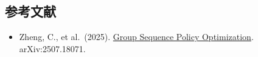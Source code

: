 \FloatBarrier
{}
\hypertarget{ux53c2ux8003ux6587ux732e-111}{%
\subsection{参考文献}\label{ux53c2ux8003ux6587ux732e-111}}

\vspace{0.25em}
\begin{itemize}
\tightlist
\item
  Zheng, C., et al.~(2025). \href{https://arxiv.org/abs/2507.18071}{Group Sequence Policy Optimization}. arXiv:2507.18071.
\end{itemize}

\clearpage
